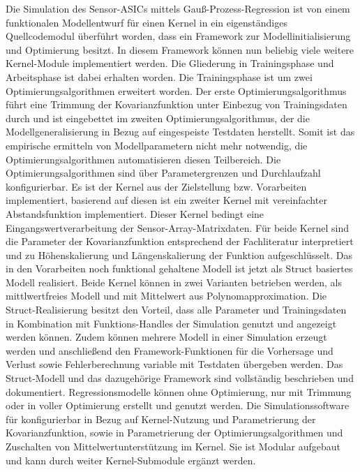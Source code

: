 \newline
Die Simulation des Sensor-ASICs mittels Gauß-Prozess-Regression ist von einem funktionalen Modellentwurf für einen Kernel in ein eigenständiges Quellcodemodul überführt worden, dass ein Framework zur Modellinitialisierung und Optimierung besitzt. In diesem Framework können nun beliebig viele weitere Kernel-Module implementiert werden. Die Gliederung in Trainingsphase und Arbeitsphase ist dabei erhalten worden. Die Trainingsphase ist um zwei Optimierungsalgorithmen erweitert worden. Der erste Optimierungsalgorithmus führt eine Trimmung der Kovarianzfunktion unter Einbezug von Trainingsdaten durch und ist eingebettet im zweiten Optimierungsalgorithmus, der die Modellgeneralisierung in Bezug auf eingespeiste Testdaten herstellt. Somit ist das empirische ermitteln von Modellparametern nicht mehr notwendig, die Optimierungsalgorithmen automatisieren diesen Teilbereich. Die Optimierungsalgorithmen sind über Parametergrenzen und Durchlaufzahl konfigurierbar. Es ist der Kernel aus der Zielstellung bzw. Vorarbeiten implementiert, basierend auf diesen ist ein zweiter Kernel mit vereinfachter Abstandsfunktion implementiert. Dieser Kernel bedingt eine Eingangswertverarbeitung der Sensor-Array-Matrixdaten. Für beide Kernel sind die Parameter der Kovarianzfunktion entsprechend der Fachliteratur interpretiert und zu Höhenskalierung und Längenskalierung der Funktion aufgeschlüsselt. Das in den Vorarbeiten noch funktional gehaltene Modell ist jetzt als Struct basiertes Modell realisiert. Beide Kernel können in zwei Varianten betrieben werden, als mittlwertfreies Modell und mit Mittelwert aus Polynomapproximation. Die Struct-Realisierung besitzt den Vorteil, dass alle Parameter und Trainingsdaten in Kombination mit Funktions-Handles der Simulation genutzt und angezeigt werden können. Zudem können mehrere Modell in einer Simulation erzeugt werden und anschließend den Framework-Funktionen für die Vorhersage und Verlust sowie Fehlerberechnung variable mit Testdaten übergeben werden. Das Struct-Modell und das dazugehörige Framework sind vollständig beschrieben und dokumentiert. Regressionsmodelle können ohne Optimierung, nur mit Trimmung oder in voller Optimierung erstellt und genutzt werden. Die Simulationssoftware für konfigurierbar in Bezug auf Kernel-Nutzung und Parametrierung der Kovarianzfunktion, sowie in Parametrierung der Optimierungsalgorithmen und Zuschalten von Mittelwertunterstützung im Kernel. Sie ist Modular aufgebaut und kann durch weiter Kernel-Submodule ergänzt werden.
\newline
